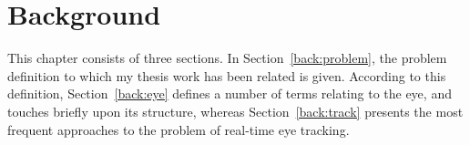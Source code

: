 
\chapter{Background}
\label{back}

This chapter consists of three sections.  In
Section~\ref{back:problem}, the problem definition to which my thesis
work has been related is given.  According to this definition,
Section~\ref{back:eye} defines a number of terms relating to the eye,
and touches briefly upon its structure, whereas
Section~\ref{back:track} presents the most frequent approaches to the
problem of real-time eye tracking.




